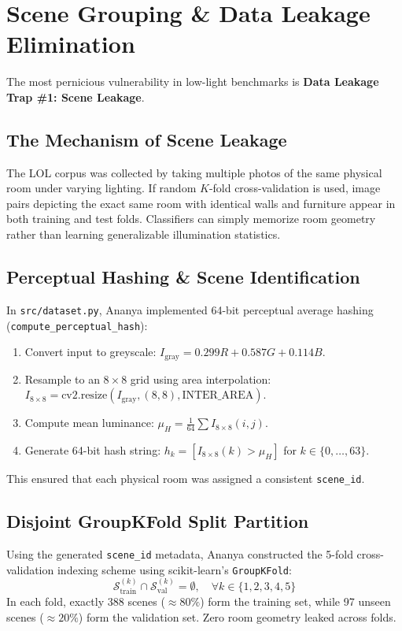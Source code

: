 \documentclass[journal]{IEEEtran}
\begin{document}
\section{Scene Grouping \& Data Leakage Elimination}
The most pernicious vulnerability in low-light benchmarks is \textbf{Data Leakage Trap \#1: Scene Leakage}.

\subsection{The Mechanism of Scene Leakage}
The LOL corpus was collected by taking multiple photos of the same physical room under varying lighting. If random $K$-fold cross-validation is used, image pairs depicting the exact same room with identical walls and furniture appear in both training and test folds. Classifiers can simply memorize room geometry rather than learning generalizable illumination statistics.

\subsection{Perceptual Hashing \& Scene Identification}
In \texttt{src/dataset.py}, Ananya implemented 64-bit perceptual average hashing (\texttt{compute\_perceptual\_hash}):
\begin{enumerate}
    \item Convert input to greyscale: $I_{\text{gray}} = 0.299R + 0.587G + 0.114B$.
    \item Resample to an $8 \times 8$ grid using area interpolation: $I_{8\times8} = \text{cv2.resize}(I_{\text{gray}}, (8, 8), \text{INTER\_AREA})$.
    \item Compute mean luminance: $\mu_H = \frac{1}{64} \sum I_{8\times8}(i, j)$.
    \item Generate 64-bit hash string: $h_k = [I_{8\times8}(k) > \mu_H]$ for $k \in \{0, \dots, 63\}$.
\end{enumerate}
This ensured that each physical room was assigned a consistent \texttt{scene\_id}.

\subsection{Disjoint GroupKFold Split Partition}
Using the generated \texttt{scene\_id} metadata, Ananya constructed the 5-fold cross-validation indexing scheme using scikit-learn's \texttt{GroupKFold}:
\begin{equation}
    \mathcal{S}_{\text{train}}^{(k)} \cap \mathcal{S}_{\text{val}}^{(k)} = \emptyset, \quad \forall k \in \{1, 2, 3, 4, 5\}
\end{equation}
In each fold, exactly 388 scenes ($\approx 80\%$) form the training set, while 97 unseen scenes ($\approx 20\%$) form the validation set. Zero room geometry leaked across folds.
\end{document}
